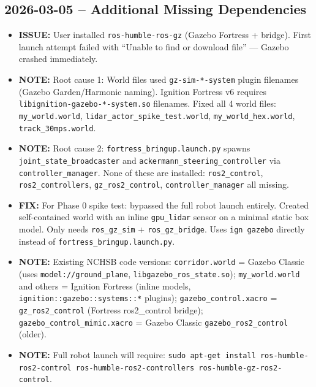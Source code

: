 \documentclass[11pt]{article}
\newcommand{\logentry}[1]{\subsection*{#1}}
\newcommand{\issue}[1]{\textcolor{issuered}{\textbf{ISSUE:} #1}}
\newcommand{\fix}[1]{\textcolor{fixgreen}{\textbf{FIX:} #1}}
\newcommand{\note}[1]{\textcolor{notblue}{\textbf{NOTE:} #1}}
\begin{document}
\logentry{2026-03-05 -- Additional Missing Dependencies}
\begin{itemize}
  \item \issue{User installed \texttt{ros-humble-ros-gz} (Gazebo Fortress + bridge). First launch attempt failed with ``Unable to find or download file'' --- Gazebo crashed immediately.}
  \item \note{Root cause 1: World files used \texttt{gz-sim-*-system} plugin filenames (Gazebo Garden/Harmonic naming). Ignition Fortress v6 requires \texttt{libignition-gazebo-*-system.so} filenames. Fixed all 4 world files: \texttt{my\_world.world}, \texttt{lidar\_actor\_spike\_test.world}, \texttt{my\_world\_hex.world}, \texttt{track\_30mps.world}.}
  \item \note{Root cause 2: \texttt{fortress\_bringup.launch.py} spawns \texttt{joint\_state\_broadcaster} and \texttt{ackermann\_steering\_controller} via \texttt{controller\_manager}. None of these are installed: \texttt{ros2\_control}, \texttt{ros2\_controllers}, \texttt{gz\_ros2\_control}, \texttt{controller\_manager} all missing.}
  \item \fix{For Phase 0 spike test: bypassed the full robot launch entirely. Created self-contained world with an inline \texttt{gpu\_lidar} sensor on a minimal static box model. Only needs \texttt{ros\_gz\_sim} + \texttt{ros\_gz\_bridge}. Uses \texttt{ign gazebo} directly instead of \texttt{fortress\_bringup.launch.py}.}
  \item \note{Existing NCHSB code versions: \texttt{corridor.world} = Gazebo Classic (uses \texttt{model://ground\_plane}, \texttt{libgazebo\_ros\_state.so}); \texttt{my\_world.world} and others = Ignition Fortress (inline models, \texttt{ignition::gazebo::systems::*} plugins); \texttt{gazebo\_control.xacro} = \texttt{gz\_ros2\_control} (Fortress ros2\_control bridge); \texttt{gazebo\_control\_mimic.xacro} = Gazebo Classic \texttt{gazebo\_ros2\_control} (older).}
  \item \note{Full robot launch will require: \texttt{sudo apt-get install ros-humble-ros2-control ros-humble-ros2-controllers ros-humble-gz-ros2-control}.}
\end{itemize}
\end{document}
